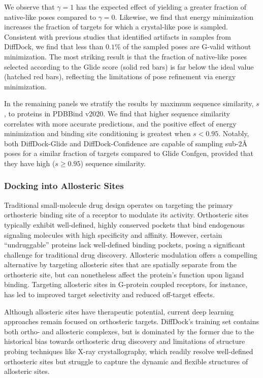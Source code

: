 \documentclass[letterpaper]{article}
\begin{document}
We observe that $\gamma=1$ has the expected effect of yielding a greater fraction of native-like poses compared to $\gamma=0$. Likewise, we find that energy minimization increases the fraction of targets for which a crystal-like pose is sampled. Consistent with previous studies that identified artifacts in samples from DiffDock, we find that less than $0.1\%$ of the sampled poses are G-valid without minimization.\cite{buttenschoen2024posebusters,errington2024plif} The most striking result is that the fraction of native-like poses selected according to the Glide score (solid red bars) is far below the ideal value (hatched red bars), reflecting the limitations of pose refinement via energy minimization.

In the remaining panels we stratify the results by maximum sequence similarity, $s$, to proteins in PDBBind v2020. We find that higher sequence similarity correlates with more accurate predictions, and the positive effect of energy minimization and binding site conditioning is greatest when $s<0.95$. Notably, both DiffDock-Glide and DiffDock-Confidence are capable of sampling sub-2{\AA} poses for a similar fraction of targets compared to Glide Confgen, provided that they have high ($s \geq 0.95$) sequence similarity.


\subsubsection{Docking into Allosteric Sites}

Traditional small-molecule drug design operates on targeting the primary orthosteric binding site of a receptor to modulate its activity. Orthosteric sites typically exhibit well-defined, highly conserved pockets that bind endogenous signaling molecules with high specificity and affinity. \cite{nussinov2012different} However, certain ``undruggable'' proteins lack well-defined binding pockets, posing a significant challenge for traditional drug discovery. Allosteric modulation offers a compelling alternative by targeting allosteric sites that are spatially separate from the orthosteric site, but can nonetheless affect the protein's function upon ligand binding.\cite{Xie2023recent} Targeting allosteric sites in G-protein coupled receptors, for instance, has led to improved target selectivity and reduced off-target effects. \cite{nussinov2023alphafold}

Although allosteric sites have therapeutic potential, current deep learning approaches remain focused on orthosteric targets. DiffDock's training set contains both ortho- and allosteric complexes, but is dominated by the former due to the historical bias towards orthosteric drug discovery and limitations of structure probing techniques like X-ray crystallography, which readily resolve well-defined orthosteric sites but struggle to capture the dynamic and flexible structures of allosteric sites.\cite{vora2025fantastic} 
\end{document}
